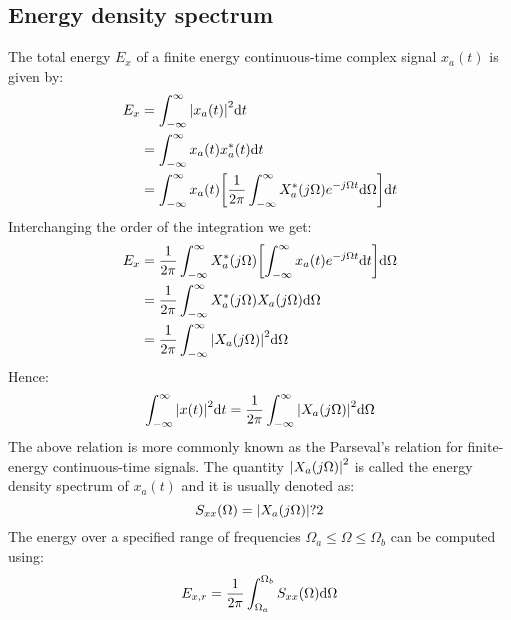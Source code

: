 \documentclass[../../main/main.tex]{subfiles}
\begin{document}
\subsection{Energy density spectrum}
The total energy \( E_{x} \) of a finite energy continuous-time complex signal \( x_{a}(t) \) is given by:
\begin{align}
    E_{x}
    &=
        \int_{-\infty}^{\infty} \abs{x_{a}(t)}^2 \mathrm{d}{t}  \nonumber   \\
    &=
        \int_{-\infty}^{\infty} x_{a}(t) x^*_{a}(t) \mathrm{d}{t}   \nonumber   \\
    &=
        \int_{-\infty}^{\infty} x_{a}(t) \qty[\frac{1}{2\pi} \int_{-\infty}^{\infty} X_{a}^{*}(j\Omega) e^{-j\Omega t} \mathrm{d}{\Omega}] \mathrm{d}{t}
\end{align}
Interchanging the order of the integration we get:
\begin{align}
    E_{x}
    &=
        \frac{1}{2\pi} \int_{-\infty}^{\infty} X_{a}^{*}(j\Omega) \qty[\int_{-\infty}^{\infty} x_{a}(t) e^{-j\Omega t} \mathrm{d}{t}] \mathrm{d}{\Omega}    \nonumber   \\
    &=
        \frac{1}{2\pi} \int_{-\infty}^{\infty} X_{a}^{*}(j\Omega) X_{a}(j\Omega) \mathrm{d}{\Omega} \nonumber   \\
    &=
        \frac{1}{2\pi} \int_{-\infty}^{\infty} \abs{X_{a}(j\Omega)}^2 \mathrm{d}{\Omega}
\end{align}
Hence:
\begin{equation}
    \int_{-\infty}^{\infty} \abs{x(t)}^2 \mathrm{d}{t}
    =
    \frac{1}{2\pi} \int_{-\infty}^{\infty} \abs{X_{a}(j\Omega)}^2 \mathrm{d}{\Omega}
    \label{eq:L08_S11_1}
\end{equation}
The above relation is more commonly known as the Parseval's relation for finite-energy continuous-time signals. The quantity \( \abs{X_{a}(j\Omega)}^2 \) is called the energy density spectrum of \( x_{a}(t) \) and it is usually denoted as:
\begin{equation}
    S_{xx}(\Omega)
    =
    \abs{X_{a}(j\Omega)}?2
    \label{eq:L08_S12_1}
\end{equation}
The energy over a specified range of frequencies \( \Omega_a \le \Omega \le \Omega_{b} \) can be computed using:
\begin{equation}
    E_{x,r}
    =
    \frac{1}{2\pi} \int_{\Omega_a}^{\Omega_b} S_{xx}(\Omega) \mathrm{d}{\Omega}
    \label{eq:L08_S12_2}
\end{equation}
\end{document}
